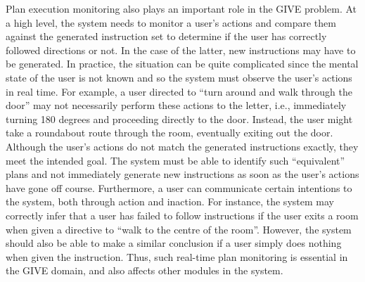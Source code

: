 Plan execution monitoring also plays an important role in the GIVE problem.
At a high level, the system needs to monitor a user's actions and compare
them against the generated instruction set to determine if the user has
correctly followed directions or not. In the case of the latter, new
instructions may have to be generated. In practice, the situation
can be quite complicated since the mental state of the user is not known
and so the system must observe the user's actions in real time. For
example, a user directed to ``turn around and walk through the door'' may
not necessarily perform these actions to the letter, i.e., immediately
turning 180 degrees and proceeding directly to the door. Instead, the user
might take a roundabout route through the room, eventually exiting out the
door. Although the user's actions do not match the generated instructions
exactly, they meet the intended goal. The system must be able to identify
such ``equivalent'' plans and not immediately generate new instructions as
soon as the user's actions have gone off course. Furthermore, a user can
communicate certain intentions to the system, both through action and
inaction. For instance, the system may correctly infer that a user has
failed to follow instructions if the user exits a room when given a
directive to ``walk to the centre of the room''. However, the system should
also be able to make a similar conclusion if a user simply does nothing
when given the instruction. Thus, such real-time plan monitoring is
essential in the GIVE domain, and also affects other modules in the system.


